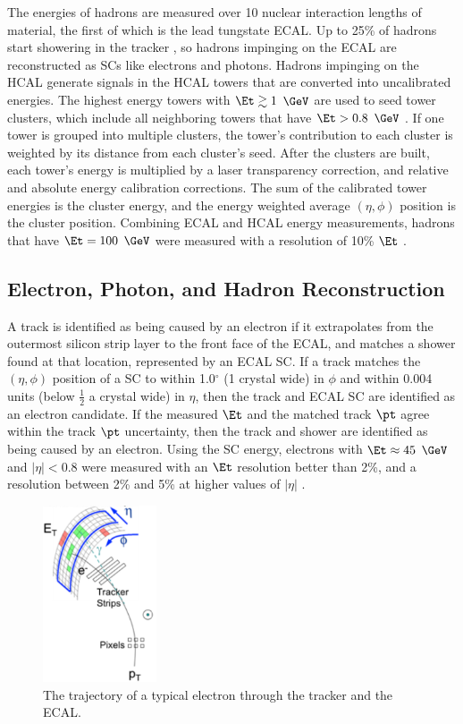 The energies of hadrons are measured over 10 nuclear interaction lengths of material, the first of which is the lead tungstate ECAL.  
Up to 25\% of hadrons start showering in the tracker \cite{trackerPerformanceInCollisions}, so hadrons impinging on the ECAL are 
reconstructed as SCs like electrons and photons.  Hadrons impinging on the HCAL generate 
signals in the HCAL towers that are converted into uncalibrated energies.  The highest energy towers with $\Et \gtrsim 1$ $\GeV$ are 
used to seed tower clusters, which include all neighboring towers that have $\Et > 0.8$ $\GeV$ \cite{pflowEventReco}.  If one tower is 
grouped into multiple clusters, the tower's contribution to each cluster is weighted by its distance from each cluster's seed.  After 
the clusters are built, each tower's energy is multiplied by a laser transparency correction, and relative and absolute energy calibration 
corrections.  The sum of the calibrated tower energies is the cluster energy, and the energy weighted average $(\eta,\phi)$ position is 
the cluster position.  Combining ECAL and HCAL energy measurements, hadrons that have $\Et = 100$ $\GeV$ were measured with a resolution 
of 10\% $\Et$ \cite{pflowEventReco}.

\subsection{Electron, Photon, and Hadron Reconstruction}
\label{sec:elePhoHadReco}
A track is identified as being caused by an electron if it extrapolates from the outermost silicon strip layer to the front face of the 
ECAL, and matches a shower found at that location, represented by an ECAL SC.  If a track matches the $(\eta,\phi)$ position of a SC to 
within 1.0$^{\circ}$ (1 crystal wide) in $\phi$ and within 0.004 units (below $\frac{1}{2}$ a crystal wide) in $\eta$, then 
the track and ECAL SC are identified as an electron candidate.  If the measured $\Et$ and the matched track $\pt$ agree within the track 
$\pt$ uncertainty, then the track and shower are identified as being caused by an electron.  Using the SC energy, electrons with 
$\Et \approx 45$ $\GeV$ and $|\eta| < 0.8$ were measured with an $\Et$ resolution better than 2\%, and a resolution between 2\% and 5\% 
at higher values of $|\eta|$ \cite{ecalPerformanceInCollisions}.

\begin{figure}[h]
	\centering
	\includegraphics[width=0.3\textwidth]{figures/electronTrackAndSupercluster.png}
	\caption{The trajectory of a typical electron through the tracker and the ECAL.}
	\label{fig:eleTrackAndSC}
\end{figure}

